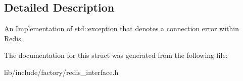 \subsection{Detailed Description}
An Implementation of std\-::exception that denotes a connection error within Redis. 

The documentation for this struct was generated from the following file\-:\begin{DoxyCompactItemize}
\item 
lib/include/factory/redis\-\_\-interface.\-h\end{DoxyCompactItemize}
